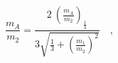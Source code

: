 \begin{equation}
\frac{m_A}{m_2}=\frac{2~\left(\frac{m_A}{m_2}\right)_\frac{1}{3}}{3\sqrt{\frac{1}{3}+\left(\frac{m_1}{m_2}\right)^2}}\quad, 
\end{equation}


